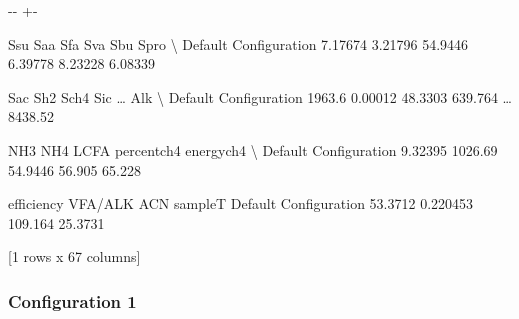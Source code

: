 \documentclass[a4paper,10pt,english]{sphinxmanual}
\newlength\nbsphinxcodecellspacing
\begin{document}
{

\kern-\sphinxverbatimsmallskipamount\kern-\baselineskip
\kern+\FrameHeightAdjust\kern-\fboxrule
\vspace{\nbsphinxcodecellspacing}

\begin{sphinxVerbatim}[commandchars=\\\{\}]
\llap{\color{nbsphinxout}[10]:\,\hspace{\fboxrule}\hspace{\fboxsep}}                          Ssu      Saa      Sfa      Sva      Sbu     Spro   \textbackslash{}
Default Configuration  7.17674  3.21796  54.9446  6.39778  8.23228  6.08339

                         Sac      Sh2     Sch4      Sic   {\ldots}     Alk   \textbackslash{}
Default Configuration  1963.6  0.00012  48.3303  639.764  {\ldots}  8438.52

                          NH3      NH4     LCFA    percentch4    energych4   \textbackslash{}
Default Configuration  9.32395  1026.69  54.9446        56.905       65.228

                       efficiency   VFA/ALK      ACN  sampleT
Default Configuration     53.3712  0.220453  109.164  25.3731

[1 rows x 67 columns]
\end{sphinxVerbatim}
}


\subsubsection{Configuration 1}
\label{\detokenize{jupyter_notebook/ADM1F_SRT_2phase:Configuration-1}}
{
\begin{sphinxVerbatim}[commandchars=\\\{\}]
\llap{\color{nbsphinxin}[11]:\,\hspace{\fboxrule}\hspace{\fboxsep}}
  
    \PYG{p}{[}\PYG{p}{]} \PYG{p}{[}\PYG{p}{]}
\end{sphinxVerbatim}
}
\end{document}
